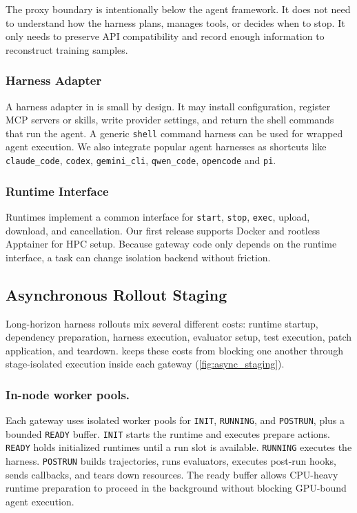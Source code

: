The proxy boundary is intentionally below the agent framework. It does not need to understand how the harness plans, manages tools, or decides when to stop. It only needs to preserve API compatibility and record enough information to reconstruct training samples.

\subsubsection{Harness Adapter}

A harness adapter in \polar is small by design. It may install configuration, register MCP servers or skills, write provider settings, and return the shell commands that run the agent. 
A generic \texttt{shell} command harness can be used for wrapped agent execution. We also integrate popular agent harnesses as shortcuts like \texttt{claude\_code}, \texttt{codex}, \texttt{gemini\_cli}, \texttt{qwen\_code}, \texttt{opencode} and \texttt{pi}.

\subsubsection{Runtime Interface}

Runtimes implement a common interface for \texttt{start}, \texttt{stop}, \texttt{exec}, upload, download, and cancellation. Our first release supports Docker and rootless Apptainer for HPC setup. Because gateway code only depends on the runtime interface, a task can change isolation backend without friction.

\subsection{Asynchronous Rollout Staging}

Long-horizon harness rollouts mix several different costs: runtime startup, dependency preparation, harness execution, evaluator setup, test execution, patch application, and teardown. \polar keeps these costs from blocking one another through stage-isolated execution inside each gateway (\cref{fig:async_staging}).

\subsubsection{In-node worker pools.}
Each gateway uses isolated worker pools for \texttt{INIT}, \texttt{RUNNING}, and \texttt{POSTRUN}, plus a bounded \texttt{READY} buffer. \texttt{INIT} starts the runtime and executes prepare actions. \texttt{READY} holds initialized runtimes until a run slot is available. \texttt{RUNNING} executes the harness. \texttt{POSTRUN} builds trajectories, runs evaluators, executes post-run hooks, sends callbacks, and tears down resources. The ready buffer allows CPU-heavy runtime preparation to proceed in the background without blocking GPU-bound agent execution.

